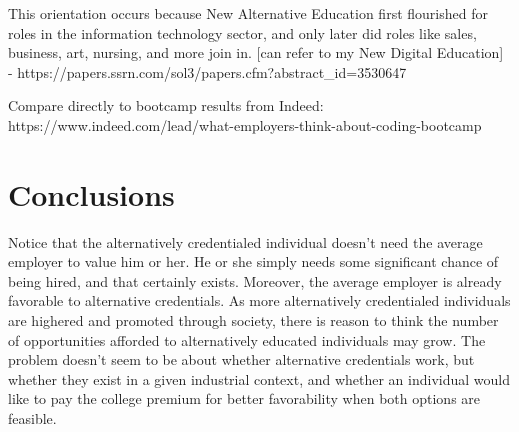 \documentclass[review]{elsarticle}
\begin{document}
This orientation occurs because New Alternative Education first flourished for roles in the information technology sector, and only later did roles like sales, business, art, nursing, and more join in.
    [can refer to my New Digital Education] - https://papers.ssrn.com/sol3/papers.cfm?abstract_id=3530647

Compare directly to bootcamp results from Indeed: https://www.indeed.com/lead/what-employers-think-about-coding-bootcamp


\section{Conclusions}


Notice that the alternatively credentialed individual doesn't need the average employer to value him or her.
He or she simply needs some significant chance of being hired, and that certainly exists.
Moreover, the average employer is already favorable to alternative credentials.
As more alternatively credentialed individuals are highered and promoted through society,
there is reason to think the number of opportunities afforded to alternatively educated individuals may grow.
The problem doesn't seem to be about whether alternative credentials work, but whether they exist in a given industrial context,
and whether an individual would like to pay the college premium for better favorability when both options are feasible.


\end{document}

